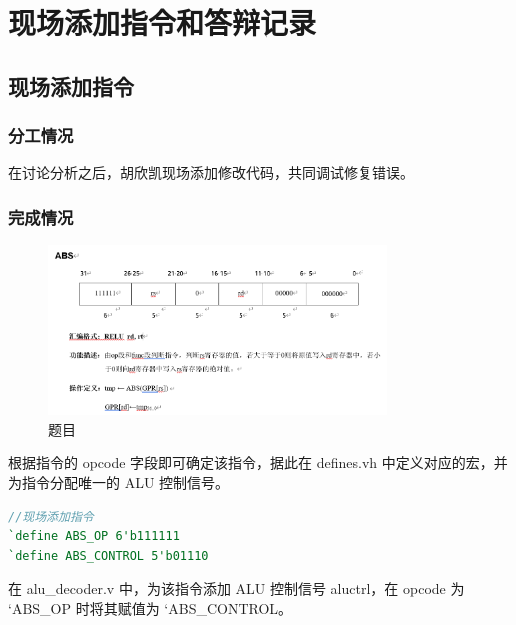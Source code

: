 \section{现场添加指令和答辩记录}

\subsection{现场添加指令}
\subsubsection{分工情况}

在讨论分析之后，胡欣凯现场添加修改代码，共同调试修复错误。

\subsubsection{完成情况}

\begin{figure}[H]
    \centering
    \includegraphics[width=0.8\textwidth]{image/addinst.png}
    \caption{题目}
    \label{fig:my_label}
\end{figure}

根据指令的 opcode 字段即可确定该指令，据此在 defines.vh 中定义对应的宏，并为指令分配唯一的 ALU 控制信号。

\begin{lstlisting}[language=Verilog]
//现场添加指令
`define ABS_OP 6'b111111
`define ABS_CONTROL 5'b01110
\end{lstlisting}

在 alu\_decoder.v 中，为该指令添加 ALU 控制信号 aluctrl，在 opcode 为 `ABS\_OP 时将其赋值为 `ABS\_CONTROL。

